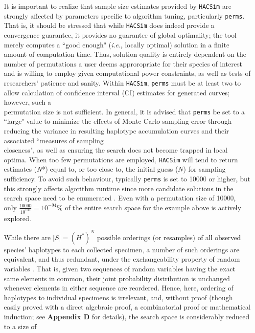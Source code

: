 It is important to realize that sample size estimates provided by {\tt HACSim} are strongly affected by parameters specific to algorithm tuning, particularly {\tt perms}. That is, it should be stressed that while {\tt HACSim} does indeed provide a convergence guarantee, it provides no guarantee of global optimality; the tool merely computes a ``good enough" (\textit{i.e.}, locally optimal) solution in a finite amount of computation time. Thus, solution quality is entirely dependent on the number of permutations a user deems approropriate for their species of interest and is willing to employ given computational power constraints, as well as tests of researchers' patience and sanity. Within {\tt HACSim}, {\tt perms} must be at least two to allow calculation of confidence interval (CI) estimates for generated curves; however, such a \\ permutation size is not sufficient. In general, it is advised that {\tt perms} be set to a ``large" value to minimize the effects of Monte Carlo sampling error through reducing the variance in resulting haplotype accumulation curves and their associated ``measures of sampling \\ closeness", as well as ensuring the search does not become trapped in local optima. When too few permutations are employed, {\tt HACSim} will tend to return estimates (\textit{N}*) equal to, or too close to, the initial guess ($N$) for sampling sufficiency. To avoid such behaviour, typically {\tt perms} is set to 10000 or higher, but this strongly affects algorithm runtime since more candidate solutions in the search space need to be enumerated \cite{phillips2020hacsim}. Even with a permutation size of 10000, only $\frac{10000}{10^{100}} = 10^{-94}\%$ of the entire search space for the example above is actively explored.

\vspace{5mm}

While there are $|S| = (H^*)^N$ possible orderings (or resamples) of all observed species' haplotypes to each collected specimen, a number of such orderings are equivalent, and thus redundant, under the exchangeability property of random variables \cite{chernick2011bootstrap}. That is, given two sequences of random variables having the exact same elements in common, their joint probability distribution is unchanged whenever elements in either sequence are reordered.  Hence, here, ordering of haplotypes to individual specimens is irrelevant, and, without proof (though easily proved with a direct algebraic proof, a combinatorial proof or mathematical induction; see \textbf{Appendix D} for details), the search space is considerably reduced to a size of

